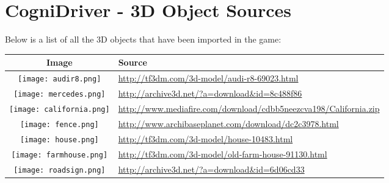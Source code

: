 \chapter{CogniDriver - 3D Object Sources}
\label{appendix:3dobjects}

Below is a list of all the 3D objects that have been imported in the game:


\begin{table}[h]
                             
\begin{tabular}{| c |m{10cm} | }
\hline
\textbf{Image}  & \textbf{Source} \\ \hline
\texttt{[image: audir8.png]}    & \url{http://tf3dm.com/3d-model/audi-r8-69023.html}    \\ \hline
\texttt{[image: mercedes.png]}    & \url{http://archive3d.net/?a=download&id=8c488f86}    \\ \hline
\texttt{[image: california.png]}    & \url{http://www.mediafire.com/download/cdbb5neezcva198/California.zip}    \\ \hline
\texttt{[image: fence.png]}    & \url{http://www.archibaseplanet.com/download/dc2c3978.html}    \\ \hline
\texttt{[image: house.png]}    & \url{http://tf3dm.com/3d-model/house-10483.html}    \\ \hline
\texttt{[image: farmhouse.png]}    & \url{http://tf3dm.com/3d-model/old-farm-house-91130.html}    \\ \hline
\texttt{[image: roadsign.png]}    & \url{http://archive3d.net/?a=download&id=6d06cd33}    \\ \hline
\end{tabular}
\end{table}